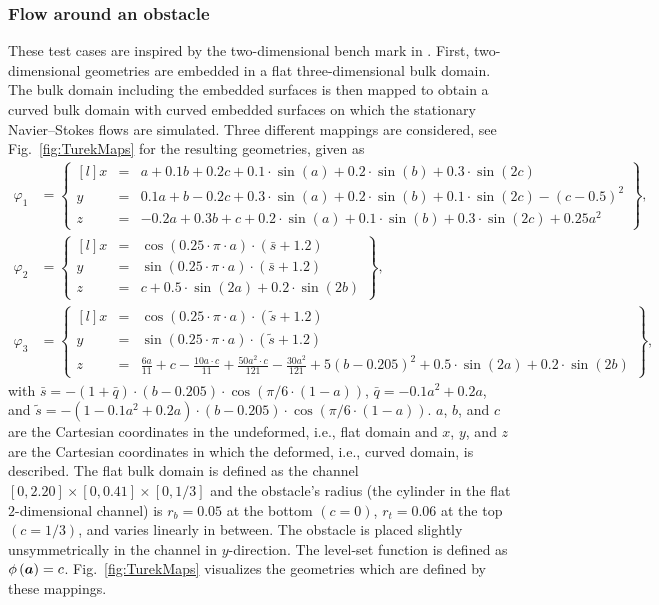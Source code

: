 \documentclass[12pt, twoside, english]{article}
\numberwithin{equation}{section}
\newcommand{\vek}[1]{\mathchoice{\displaystyle\boldsymbol#1}
{\textstyle\boldsymbol#1}{\scriptstyle\boldsymbol#1}
{\scriptscriptstyle\boldsymbol#1}}
\begin{document}
\subsubsection{Flow around an obstacle}\label{subsec:CylFlowStat}
These test cases are inspired by the two-dimensional bench mark in \cite{Schaefer_1996a}. First, two-dimensional geometries are embedded in a flat three-dimensional bulk domain. The bulk domain including the embedded surfaces is then mapped to obtain a curved bulk domain with curved embedded surfaces on which the stationary Navier--Stokes flows are simulated. Three different mappings are considered, see Fig.~\ref{fig:TurekMaps} for the resulting geometries, given as
\begin{align}
	\varphi_1 &= \begin{Bmatrix*}[l]
		x &=& a + 0.1b + 0.2c + 0.1 \cdot \sin(a) + 0.2 \cdot  \sin(b) + 0.3 \cdot \sin(2c)\\
		y &=& 0.1a + b - 0.2c + 0.3 \cdot \sin(a) + 0.2 \cdot \sin(b) + 0.1 \cdot \sin(2c) - (c-0.5)^2\\
		z &=&-0.2a + 0.3b + c + 0.2 \cdot \sin(a) + 0.1 \cdot \sin(b) + 0.3 \cdot \sin(2c) + 0.25a^2
	\end{Bmatrix*},\nonumber\\
	\varphi_2 &= \begin{Bmatrix*}[l]
		x &=& \cos(0.25\cdot \pi \cdot a) \cdot (\bar{s}+1.2)\\
		y &=& \sin(0.25\cdot \pi \cdot a) \cdot (\bar{s}+1.2)\\
		z &=& c + 0.5 \cdot \sin(2a) + 0.2\cdot \sin(2b)
	\end{Bmatrix*},\label{eq:TurekMaps}\\
	\varphi_3 &= \begin{Bmatrix*}[l]
		x &=& \cos(0.25\cdot \pi \cdot a) \cdot  (\tilde{s}+1.2)\\
		y &=& \sin(0.25\cdot \pi \cdot a)  \cdot (\tilde{s}+1.2)\\
		z &=& \frac{6a}{11} + c - \frac{10a\cdot c}{11} + \frac{50a^2\cdot c}{121} - \frac{30a^2}{121} + 5(b-0.205)^2 + 0.5\cdot \sin(2a) + 0.2 \cdot \sin(2b)
	\end{Bmatrix*}\nonumber,		
	\end{align}
with $\bar{s} = -(1+\bar{q}) \cdot (b-0.205) \cdot \cos(\pi/6\cdot(1-a))$, $\bar{q} = -0.1a^2 + 0.2a$, and $ \tilde{s} = -(1-0.1a^2 + 0.2a) \cdot (b-0.205) \cdot \cos(\pi/6\cdot(1-a))$. $a$, $b$, and $c$ are the Cartesian coordinates in the undeformed, i.e., flat domain and $x$, $y$, and $z$ are the Cartesian coordinates in which the deformed, i.e., curved domain, is described. The flat bulk domain is defined as the channel $[0,2.20] \times [0,0.41] \times [0,1/3]$ and the obstacle's radius (the cylinder in the flat $2$-dimensional channel) is $r_b = 0.05$ at the bottom $(c=0)$, $r_t = 0.06$ at the top $(c=1/3)$, and varies linearly in between. The obstacle is placed slightly unsymmetrically in the channel in $y$-direction. The level-set function is defined as $\phi\left(\vek{a}\right)=c$. Fig.~\ref{fig:TurekMaps} visualizes the geometries which are defined by these mappings.
\end{document}
